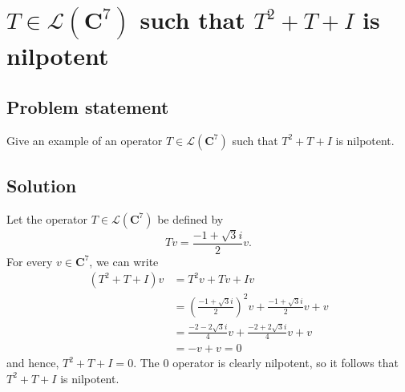 \documentclass{article}
\begin{document}
\clearpage

\section{$T\in\mathcal{L}(\mathbf{C}^7)$ such that $T^2+T+I$ is nilpotent}
\subsection*{Problem statement}
Give an example of an operator $T\in\mathcal{L}(\mathbf{C}^7)$ such that $T^2+T+I$ is nilpotent.

\subsection*{Solution}
Let the operator $T\in\mathcal{L}(\mathbf{C}^7)$ be defined by
\[Tv=\frac{-1+\sqrt{3}i}{2}v.\]
For every $v\in\mathbf{C}^7$, we can write
\begin{align*}
    (T^2+T+I)v&=T^2v+Tv+Iv\\
    &=(\frac{-1+\sqrt{3}i}{2})^2v+\frac{-1+\sqrt{3}i}{2}v+v\\
    &=\frac{-2-2\sqrt{3}i}{4}v+\frac{-2+2\sqrt{3}i}{4}v+v\\
    &=-v+v=0
\end{align*}
and hence, $T^2+T+I=0$. The $0$ operator is clearly nilpotent, so it follows that $T^2+T+I$ is nilpotent.
\end{document}
